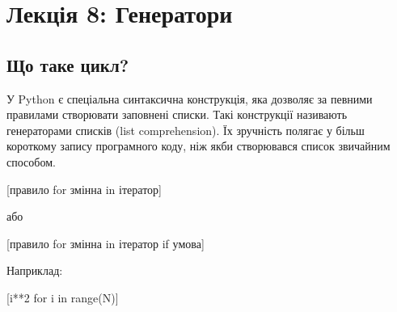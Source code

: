 \section{Лекція 8: Генератори}
 
 \subsection{Що таке цикл?} 
\begin{frame}
У Python є спеціальна синтаксична конструкція, яка дозволяє за певними правилами створювати заповнені списки. Такі конструкції називають генераторами списків (list comprehension). Їх зручність полягає у більш короткому запису програмного коду, ніж якби створювався список звичайним способом.

\LARGE{[правило for змінна in ітератор]}

\normalsize або

\LARGE{[правило for змінна in ітератор if умова]}

\normalsize Наприклад:

[i**2 for i in range(N)]

\end{frame}

